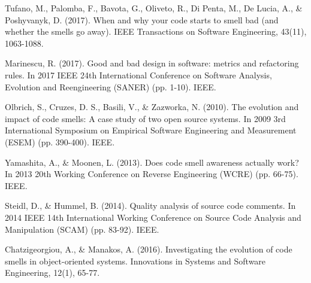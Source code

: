 \documentclass[sigconf,screen]{acmart}
\begin{document}
\begin{thebibliography}{00}
 Tufano, M., Palomba, F., Bavota, G., Oliveto, R., Di Penta, M., De Lucia, A., \& Poshyvanyk, D. (2017). When and why your code starts to smell bad (and whether the smells go away). IEEE Transactions on Software Engineering, 43(11), 1063-1088.

 Marinescu, R. (2017). Good and bad design in software: metrics and refactoring rules. In 2017 IEEE 24th International Conference on Software Analysis, Evolution and Reengineering (SANER) (pp. 1-10). IEEE.

 Olbrich, S., Cruzes, D. S., Basili, V., \& Zazworka, N. (2010). The evolution and impact of code smells: A case study of two open source systems. In 2009 3rd International Symposium on Empirical Software Engineering and Measurement (ESEM) (pp. 390-400). IEEE.

 Yamashita, A., \& Moonen, L. (2013). Does code smell awareness actually work? In 2013 20th Working Conference on Reverse Engineering (WCRE) (pp. 66-75). IEEE.

 Steidl, D., \& Hummel, B. (2014). Quality analysis of source code comments. In 2014 IEEE 14th International Working Conference on Source Code Analysis and Manipulation (SCAM) (pp. 83-92). IEEE.

 Chatzigeorgiou, A., \& Manakos, A. (2016). Investigating the evolution of code smells in object-oriented systems. Innovations in Systems and Software Engineering, 12(1), 65-77.
\end{thebibliography}
\end{document}
